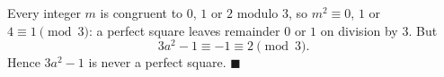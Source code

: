 Every integer $m$ is congruent to $0$, $1$ or $2$ modulo $3$, so $m^2\equiv0$, $1$ or $4\equiv1\pmod3$: a perfect square leaves remainder $0$ or $1$ on division by $3$. But
\[
3a^2-1\equiv-1\equiv2\pmod3 .
\]
Hence $3a^2-1$ is never a perfect square. $\blacksquare$
